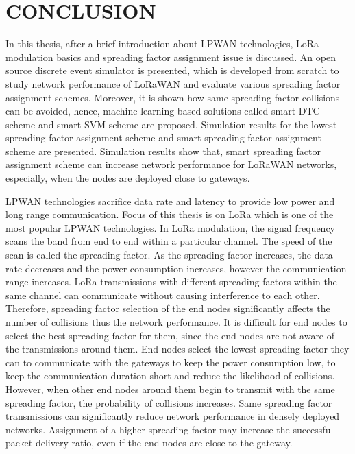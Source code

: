 \chapter{CONCLUSION}\label{ch:conclusion}

In this thesis, after a brief introduction about LPWAN technologies, LoRa modulation basics and spreading factor assignment issue is discussed. An open source discrete event simulator is presented, which is developed from scratch to study network performance of LoRaWAN and evaluate various spreading factor assignment schemes. Moreover, it is shown how same spreading factor collisions can be avoided, hence, machine learning based solutions called smart DTC scheme and smart SVM scheme are proposed. Simulation results for the lowest spreading factor assignment scheme and smart spreading factor assignment scheme are presented. Simulation results show that, smart spreading factor assignment scheme can increase network performance for LoRaWAN networks, especially, when the nodes are deployed close to gateways.

LPWAN technologies sacrifice data rate and latency to provide low power and long range communication. Focus of this thesis is on LoRa which is one of the most popular LPWAN technologies. In LoRa modulation, the signal frequency scans the band from end to end within a particular channel. The speed of the scan is called the spreading factor. As the spreading factor increases, the data rate decreases and the power consumption increases, however the communication range increases. LoRa transmissions with different spreading factors within the same channel can communicate without causing interference to each other. Therefore, spreading factor selection of the end nodes significantly affects the number of collisions thus the network performance. It is difficult for end nodes to select the best spreading factor for them, since the end nodes are not aware of the transmissions around them. End nodes select the lowest spreading factor they can to communicate with the gateways to keep the power consumption low, to keep the communication duration short and reduce the likelihood of collisions. However, when other end nodes around them begin to transmit with the same spreading factor, the probability of collisions increases. Same spreading factor transmissions can significantly reduce network performance in densely deployed networks. Assignment of a higher spreading factor may increase the successful packet delivery ratio, even if the end nodes are close to the gateway.

